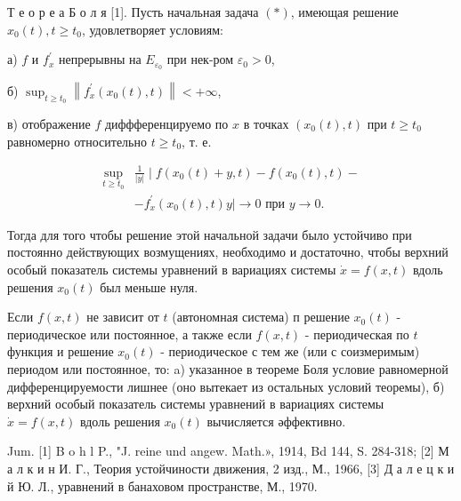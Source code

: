 \documentclass[10pt]{article}
\begin{document}
Т е о р е а Б о л я [1]. Пусть начальная задача $(*)$, имеющая решение $x_{0}(t), t \geqslant t_{0}$, удовлетворяет условиям:



а) $f$ и $f_{x}^{\prime}$ непрерывны на $E_{\varepsilon_{0}}$ при нек-ром $\varepsilon_{0}>0$,



б) $\sup _{t \geqslant t_{0}}\left\|f_{x}^{\prime}\left(x_{0}(t), t\right)\right\|<+\infty$,



в) отображение $f$ диффференцируемо по $x$ в точках $\left(x_{0}(t), t\right)$ при $t \geqslant t_{0}$ равномерно относительно $t \geqslant t_{0}$, т. е.



\[

\begin{aligned}

\sup _{t \geqslant t_{0}} & \frac{1}{|y|} \mid f\left(x_{0}(t)+y, t\right)-f\left(x_{0}(t), t\right)- \\

& -f_{x}^{\prime}\left(x_{0}(t), t\right) y \mid \longrightarrow 0 \text { при } y \longrightarrow 0 .

\end{aligned}

\]



Тогда для того чтобы решение этой начальной задачи было устойчиво при постоянно действующих возмущениях, необходимо и достаточно, чтобы верхний особый показатель системы уравнений в вариациях системы $\dot{x}=f(x, t)$ вдоль решения $x_{0}(t)$ был меньше нуля.



Если $f(x, t)$ не зависит от $t$ (автономная система) п решение $x_{0}(t)$ - периодическое или постоянное, а также если $f(x, t)$ - периодическая по $t$ функция и решение $x_{0}(t)$ - периодическое с тем же (или с соизмеримым) периодом или постоянное, то: a) указанное в теореме Боля условие равномерной дифференцируемости лишнее (оно вытекает из остальных условий теоремы), б) верхний особый показатель системы уравнений в вариациях системы $\dot{x}=f(x, t)$ вдоль решения $x_{0}(t)$ вычисляется әффективно.



Jum. [1] B o h l P., "J. reine und angew. Math.», 1914, Bd 144, S. 284-318; [2] М а л к и н И. Г., Теория устойчиности движения, 2 изд., М., 1966, [3] Д а л е ц к и й Ю. Л., уравнений в банаховом пространстве, М., 1970.
\end{document}
